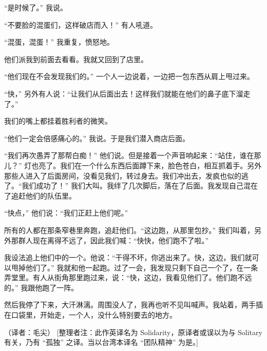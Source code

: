 “是时候了。” 我说。


“不要脸的混蛋们，这样破店而入！” 有人吼道。


“混蛋，混蛋！” 我重复，愤怒地。


他们派我到前面去看看。我就又回到了店里。


“他们现在不会发现我们的。” 一个人一边说着，一边把一包东西从肩上甩过来。


“快，” 另外有人说：“让我们从后面出去！这样我们就能在他们的鼻子底下溜走了。”


我们的嘴上都挂着胜利者的微笑。


“他们一定会倍感痛心的。” 我说。于是我们潜入商店后面。


“我们再次愚弄了那帮白痴！” 他们说。但是接着一个声音响起来：“站住，谁在那儿？” 灯也亮了。我们在一个什么东西后面蹲下来，脸色苍白，相互抓着手。另外那些人进入了后面房间，没看见我们，转过身去。我们冲出去，发疯也似的逃了。“我们成功了！” 我们大叫。我绊了几次脚后，落在了后面。我发现自己混在了追赶他们的队伍里。


“快点，” 他们说：“我们正赶上他们呢。”


所有的人都在那条窄巷里奔跑，追赶他们。“这边跑，从那里包抄。” 我们叫着，另外那群人现在离得不远了，因此我们喊：“快快，他们跑不了啦。”


我设法追上他们中的一个。他说：“干得不坏，你逃出来了。快，这边，我们就可以甩掉他们了。” 我就和他一起跑。过了一会，我发现只剩下自己一个了，在一条弄堂里。有人从街角那里跑过来，说：“快，这边，我看见他们了。他们跑不远的。” 我跟他跑了一阵。


然后我停了下来，大汗淋漓。周围没人了，我再也听不见叫喊声。我站着，两手插在口袋里，开始走，一个人，没什么特别要去的地方。


（译者：毛尖）
[整理者注：此作英译名为 Solidarity，原译者或误以为与 Solitary 有关，乃有 “孤独” 之译。当以台湾本译名 “团队精神” 为是。]
